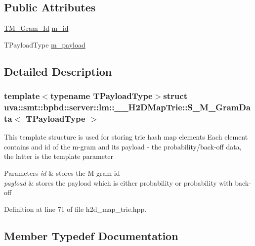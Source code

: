 \subsection*{Public Attributes}
\begin{DoxyCompactItemize}
\item 
\hyperlink{structuva_1_1smt_1_1bpbd_1_1server_1_1lm_1_1_____h2_d_map_trie_1_1_s___m___gram_data_a306639499a99126a64e77b6c254a3651}{T\+M\+\_\+\+Gram\+\_\+\+Id} \hyperlink{structuva_1_1smt_1_1bpbd_1_1server_1_1lm_1_1_____h2_d_map_trie_1_1_s___m___gram_data_ad948066e5c69d58cf46c7c803711efbd}{m\+\_\+id}
\item 
T\+Payload\+Type \hyperlink{structuva_1_1smt_1_1bpbd_1_1server_1_1lm_1_1_____h2_d_map_trie_1_1_s___m___gram_data_afd5e80f9c1aac1133ee03f0a6f3b5212}{m\+\_\+payload}
\end{DoxyCompactItemize}


\subsection{Detailed Description}
\subsubsection*{template$<$typename T\+Payload\+Type$>$struct uva\+::smt\+::bpbd\+::server\+::lm\+::\+\_\+\+\_\+\+H2\+D\+Map\+Trie\+::\+S\+\_\+\+M\+\_\+\+Gram\+Data$<$ T\+Payload\+Type $>$}

This template structure is used for storing trie hash map elements Each element contains and id of the m-\/gram and its payload -\/ the probability/back-\/off data, the latter is the template parameter 
\begin{DoxyParams}{Parameters}
{\em id} & stores the M-\/gram id \\
\hline
{\em payload} & stores the payload which is either probability or probability with back-\/off \\
\hline
\end{DoxyParams}


Definition at line 71 of file h2d\+\_\+map\+\_\+trie.\+hpp.



\subsection{Member Typedef Documentation}
\hypertarget{structuva_1_1smt_1_1bpbd_1_1server_1_1lm_1_1_____h2_d_map_trie_1_1_s___m___gram_data_a4750400269782e74ff27b2c7da8e684d}{}
